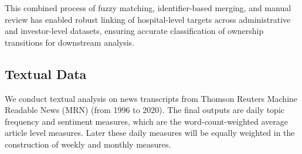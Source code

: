 \documentclass[11pt]{article}
\begin{document}
This combined process of fuzzy matching, identifier-based merging, and manual review has enabled robust linking of hospital-level targets across administrative and investor-level datasets, ensuring accurate classification of ownership transitions for downstream analysis.


\subsection{Textual Data}
We conduct textual analysis on news transcripts from Thomson Reuters Machine Readable News (MRN) (from 1996 to 2020). The final outputs are daily topic frequency and sentiment measures, which are the word-count-weighted average article level measures. Later these daily measures will be equally weighted in the construction of weekly and monthly measures.\\
\end{document}
